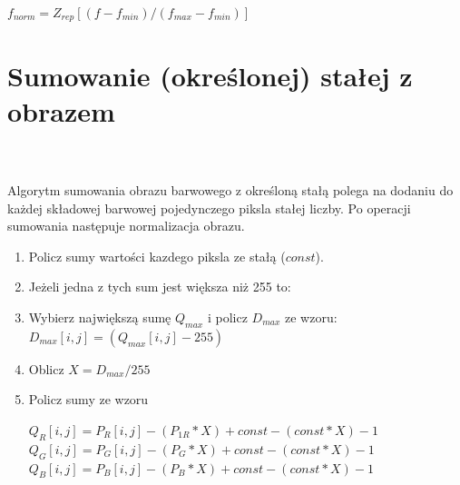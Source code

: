 \documentclass[final,a4paper,openany,12pt]{mwbk}
\begin{document}
	\begin{center}
		$ f_{norm} = Z_{rep}[(f - f_{min}) / (f_{max} - f_{min})] $
	\end{center}


\section{Sumowanie (określonej) stałej z obrazem}
\hfill
\\\\
\indent
Algorytm sumowania obrazu barwowego z określoną stałą polega na dodaniu do każdej składowej barwowej pojedynczego piksla stałej liczby.
Po operacji sumowania następuje normalizacja obrazu.

	\begin{enumerate}	
		\item Policz sumy wartości kazdego piksla ze stałą ($const$).
		\item Jeżeli jedna z tych sum jest większa niż 255 to:
		\item Wybierz największą sumę  $Q_{max}$ i policz $D_{max}$ ze wzoru: $D_{max}[i,j] = (Q_{max}[i,j] - 255)$ 
		\item Oblicz $X = D_{max} / 255$
		\item Policz sumy ze wzoru
		\begin{center}$Q_{R}[i,j] = P_{R}[i,j] - (P_{1R} * X)+ const - (const * X) -1$ \\
			$Q_{G}[i,j] = P_{G}[i,j] - (P_{G} * X)+ const - (const * X) -1$ \\
			$Q_{B}[i,j] = P_{B}[i,j] - (P_{B} * X)+ const - (const * X) -1$
		\end{center}
	\end{enumerate}
\end{document}
